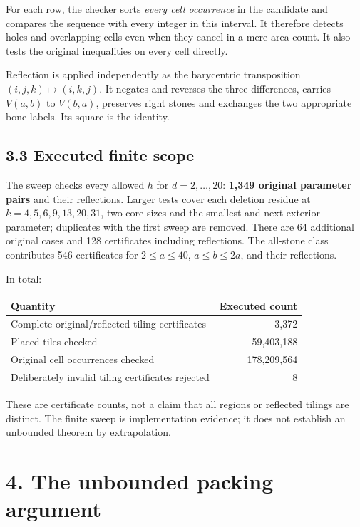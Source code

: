 \documentclass[
  11pt,
]{article}
\begin{document}
For each row, the checker sorts \emph{every cell occurrence} in the
candidate and compares the sequence with every integer in this interval.
It therefore detects holes and overlapping cells even when they cancel
in a mere area count. It also tests the original inequalities on every
cell directly.

Reflection is applied independently as the barycentric transposition
\((i,j,k)\mapsto(i,k,j)\). It negates and reverses the three
differences, carries \(V(a,b)\) to \(V(b,a)\), preserves right stones
and exchanges the two appropriate bone labels. Its square is the
identity.

\subsection{3.3 Executed finite scope}\label{executed-finite-scope}

The sweep checks every allowed \(h\) for \(d=2,\ldots,20\):
\textbf{1,349 original parameter pairs} and their reflections. Larger
tests cover each deletion residue at \(k=4,5,6,9,13,20,31\), two core
sizes and the smallest and next exterior parameter; duplicates with the
first sweep are removed. There are 64 additional original cases and 128
certificates including reflections. The all-stone class contributes 546
certificates for \(2\le a\le40\), \(a\le b\le2a\), and their
reflections.

In total:

\begin{longtable}[]{@{}lr@{}}
\toprule\noalign{}
Quantity & Executed count \\
\midrule\noalign{}
\endhead
\bottomrule\noalign{}
\endlastfoot
Complete original/reflected tiling certificates & 3,372 \\
Placed tiles checked & 59,403,188 \\
Original cell occurrences checked & 178,209,564 \\
Deliberately invalid tiling certificates rejected & 8 \\
\end{longtable}

These are certificate counts, not a claim that all regions or reflected
tilings are distinct. The finite sweep is implementation evidence; it
does not establish an unbounded theorem by extrapolation.

\section{4. The unbounded packing
argument}\label{the-unbounded-packing-argument}
\end{document}
